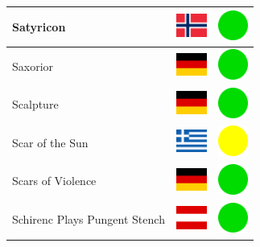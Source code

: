 \documentclass[12pt, a4paper, twoside]{report}
\begin{document}
\begin{center}
\begin{longtable}{|p{5cm}|p{2cm}|p{2cm}|}
 Satyricon                                                  & \includegraphics[width=1cm]{../img/flags/no} &   \includegraphics[width=1cm]{../likes/y} \\ \hline
 Saxorior                                                   & \includegraphics[width=1cm]{../img/flags/de} &   \includegraphics[width=1cm]{../likes/y} \\ \hline
 Scalpture                                                  & \includegraphics[width=1cm]{../img/flags/de} &   \includegraphics[width=1cm]{../likes/y} \\ \hline
 Scar of the Sun                                            & \includegraphics[width=1cm]{../img/flags/gr} &   \includegraphics[width=1cm]{../likes/m} \\ \hline
 Scars of Violence                                          & \includegraphics[width=1cm]{../img/flags/de} &   \includegraphics[width=1cm]{../likes/y} \\ \hline
 Schirenc Plays Pungent Stench                              & \includegraphics[width=1cm]{../img/flags/at} &   \includegraphics[width=1cm]{../likes/y} \\ \hline

\end{longtable}
\end{center}
\end{document}
